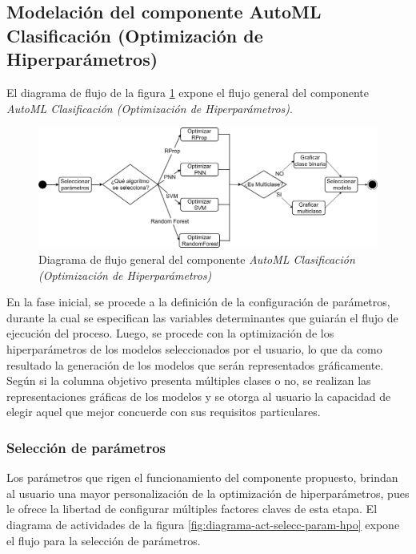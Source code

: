 \subsection{Modelación del componente AutoML Clasificación (Optimización de Hiperparámetros)}
El diagrama de flujo de la figura \ref{fig:diagrama-flujo-gral-comp-hpo} expone el flujo general del componente \textit{AutoML Clasificación (Optimización de Hiperparámetros)}.

\begin{figure}[h]
	\centering
	\includegraphics[width=1\linewidth]{"figuras/capi 2/hpo/diagrama-flujo-gral-comp-hpo"}
	\caption[Diagrama de flujo general del componente AutoML Clasificación (Optimización de Hiperparámetros)]{Diagrama de flujo general del componente \textit{AutoML Clasificación (Optimización de Hiperparámetros)}}
	\label{fig:diagrama-flujo-gral-comp-hpo}
\end{figure}

En la fase inicial, se procede a la definición de la configuración de parámetros, durante la cual se especifican las variables determinantes que guiarán el flujo de ejecución del proceso. Luego, se procede con la optimización de los hiperparámetros de los modelos seleccionados por el usuario, lo que da como resultado la generación de los modelos que serán representados gráficamente. Según si la columna objetivo presenta múltiples clases o no, se realizan las representaciones gráficas de los modelos y se otorga al usuario la capacidad de elegir aquel que mejor concuerde con sus requisitos particulares.

\subsubsection*{Selección de parámetros}
Los parámetros que rigen el funcionamiento del componente propuesto, brindan al usuario una mayor personalización de la optimización de hiperparámetros, pues le ofrece la libertad de configurar múltiples factores claves de esta etapa. El diagrama de actividades de la figura \ref{fig:diagrama-act-selecc-param-hpo} expone el flujo para la selección de parámetros.

